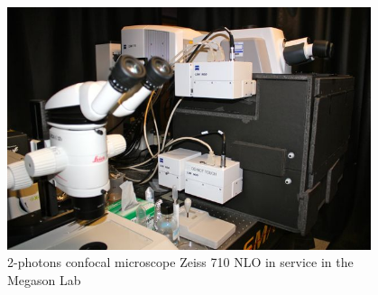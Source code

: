 \begin{figure}[htb]
\begin{center}
\leavevmode
\includegraphics[width=0.95\textwidth]{pictures/PICmicroscope}
\end{center}
\caption{2-photons confocal microscope Zeiss 710 NLO in service in the Megason Lab}
\label{fig:MicMegason}
\end{figure}

\clearpage


%




